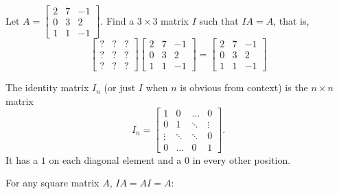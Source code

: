 


\begin{applicationActivities}{2}{22}

\begin{activity}{5}
Let $A=\begin{bmatrix} 2 & 7 & -1 \\ 0 & 3 & 2 \\ 1 & 1 & -1 \end{bmatrix}$.  Find a $3 \times 3$ matrix $I$ such that $IA=A$, that is,
\[
  \begin{bmatrix} ? & ? & ? \\ ? & ? & ? \\ ? & ? & ? \end{bmatrix}
  \begin{bmatrix} 2 & 7 & -1 \\ 0 & 3 & 2 \\ 1 & 1 & -1 \end{bmatrix}
=
  \begin{bmatrix} 2 & 7 & -1 \\ 0 & 3 & 2 \\ 1 & 1 & -1 \end{bmatrix}
\]
\end{activity}

\begin{definition}
The identity matrix $I_n$ (or just $I$ when $n$ is obvious from context) is  the $n \times n$ matrix $$I_n = \begin{bmatrix} 1 & 0  & \hdots & 0 \\ 0 & 1 & \ddots & \vdots  \\ \vdots & \ddots & \ddots & 0 \\ 0 & \hdots & 0 & 1 \end{bmatrix}.$$
It has a $1$ on each diagonal element and a $0$ in every other position.
\end{definition}

\begin{fact}
  For any square matrix \(A\), \(IA=AI=A\):


\end{fact}
\end{applicationActivities}
